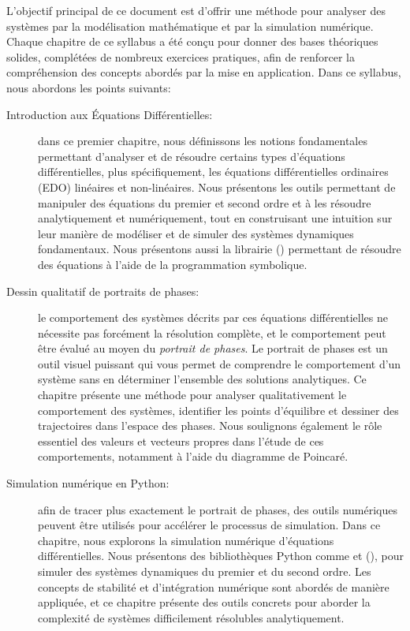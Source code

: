     L'objectif principal de ce document est d'offrir une méthode pour analyser des systèmes par la modélisation mathématique et par la simulation numérique. Chaque chapitre de ce syllabus a été conçu pour donner des bases théoriques solides, complétées de nombreux exercices pratiques, afin de renforcer la compréhension des concepts abordés par la mise en application. 
    Dans ce syllabus, nous abordons les points suivants:
    \begin{description}
        \item[Introduction aux Équations Différentielles:] dans ce premier chapitre, nous définissons les notions fondamentales permettant d'analyser et de résoudre certains types d'équations différentielles, plus spécifiquement, les équations différentielles ordinaires (EDO) linéaires et non-linéaires. Nous présentons les outils permettant de manipuler des équations du premier et second ordre et à les résoudre analytiquement et numériquement, tout en construisant une intuition sur leur manière de modéliser et de simuler des systèmes dynamiques fondamentaux. Nous présentons aussi la librairie  (\cite{Sympy2017}) permettant de résoudre des équations à l'aide de la programmation symbolique.
        \item[Dessin qualitatif de portraits de phases:] le comportement des systèmes décrits par ces équations différentielles ne nécessite pas forcément la résolution complète, et le comportement peut être évalué au moyen du \textit{portrait de phases}. Le portrait de phases est un outil visuel puissant qui vous permet de comprendre le comportement d'un système sans en déterminer l'ensemble des solutions analytiques. Ce chapitre présente une méthode pour analyser qualitativement le comportement des systèmes, identifier les points d’équilibre et dessiner des trajectoires dans l’espace des phases. Nous soulignons également le rôle essentiel des valeurs et vecteurs propres dans l'étude de ces comportements, notamment à l'aide du diagramme de Poincaré.
        \item[Simulation numérique en Python:] afin de tracer plus exactement le portrait de phases, des outils numériques peuvent être utilisés pour accélérer le processus de simulation. Dans ce chapitre, nous explorons la simulation numérique d’équations différentielles. Nous présentons des bibliothèques Python comme  et  (\cite{Numpy2020, Scipy2020}), pour simuler des systèmes dynamiques du premier et du second ordre. Les concepts de stabilité et d’intégration numérique sont abordés de manière appliquée, et ce chapitre présente des outils concrets pour aborder la complexité de systèmes difficilement résolubles analytiquement. 

\end{description}
